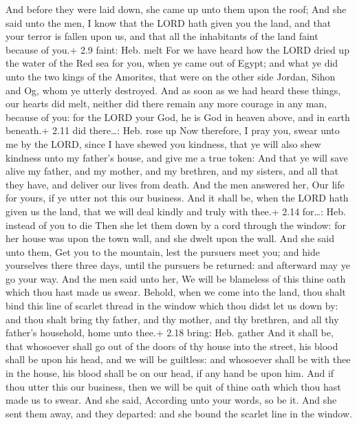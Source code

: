  And before they were laid down, she came up unto them
upon the roof;  And she said unto the men, I know that the
LORD hath given you the land, and that your terror is fallen upon us,
and that all the inhabitants of the land faint because of you.+ 2.9
faint: Heb. melt  For we have heard how the LORD dried up
the water of the Red sea for you, when ye came out of Egypt; and what ye
did unto the two kings of the Amorites, that were on the other side
Jordan, Sihon and Og, whom ye utterly destroyed.  And as
soon as we had heard these things, our hearts did melt, neither did
there remain any more courage in any man, because of you: for the LORD
your God, he is God in heaven above, and in earth beneath.+ 2.11 did
there\ldots: Heb. rose up  Now therefore, I pray you, swear
unto me by the LORD, since I have shewed you kindness, that ye will also
shew kindness unto my father's house, and give me a true token:
 And that ye will save alive my father, and my mother, and
my brethren, and my sisters, and all that they have, and deliver our
lives from death.  And the men answered her, Our life for
yours, if ye utter not this our business. And it shall be, when the LORD
hath given us the land, that we will deal kindly and truly with thee.+
2.14 for\ldots: Heb. instead of you to die  Then she let
them down by a cord through the window: for her house was upon the town
wall, and she dwelt upon the wall.  And she said unto them,
Get you to the mountain, lest the pursuers meet you; and hide yourselves
there three days, until the pursuers be returned: and afterward may ye
go your way.  And the men said unto her, We will be
blameless of this thine oath which thou hast made us swear.
 Behold, when we come into the land, thou shalt bind this
line of scarlet thread in the window which thou didst let us down by:
and thou shalt bring thy father, and thy mother, and thy brethren, and
all thy father's household, home unto thee.+ 2.18 bring: Heb. gather
 And it shall be, that whosoever shall go out of the doors
of thy house into the street, his blood shall be upon his head, and we
will be guiltless: and whosoever shall be with thee in the house, his
blood shall be on our head, if any hand be upon him.  And
if thou utter this our business, then we will be quit of thine oath
which thou hast made us to swear.  And she said, According
unto your words, so be it. And she sent them away, and they departed:
and she bound the scarlet line in the window.

